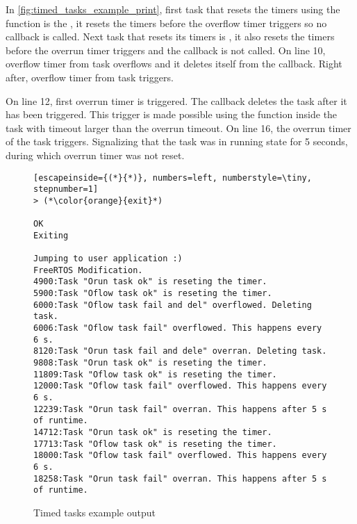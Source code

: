 In \autoref{fig:timed_tasks_example_print}, first task that resets the timers using the function  is the , it resets the timers before the overflow timer triggers so no callback is called. Next task that resets its timers is , it also resets the timers before the overrun timer triggers and the callback is not called. On line 10, overflow timer from task  overflows and it deletes itself from the callback. Right after, overflow timer from task  triggers.

On line 12, first overrun timer is triggered. The callback deletes the task after it has been triggered. This trigger is made possible using the  function inside the task with timeout larger than the overrun timeout. On line 16, the overrun timer of the task  triggers. Signalizing that the task was in running state for 5 seconds, during which overrun timer was not reset.

\begin{figure}[H]
\begin{changemargin}{1cm}{1cm}
\begin{lstlisting}[escapeinside={(*}{*)}, numbers=left, numberstyle=\tiny, stepnumber=1]
> (*\color{orange}{exit}*)

OK
Exiting

Jumping to user application :)
FreeRTOS Modification.
4900:Task "Orun task ok" is reseting the timer.
5900:Task "Oflow task ok" is reseting the timer.
6000:Task "Oflow task fail and del" overflowed. Deleting task.
6006:Task "Oflow task fail" overflowed. This happens every 6 s.
8120:Task "Orun task fail and dele" overran. Deleting task.
9808:Task "Orun task ok" is reseting the timer.
11809:Task "Oflow task ok" is reseting the timer.
12000:Task "Oflow task fail" overflowed. This happens every 6 s.
12239:Task "Orun task fail" overran. This happens after 5 s of runtime.
14712:Task "Orun task ok" is reseting the timer.
17713:Task "Oflow task ok" is reseting the timer.
18000:Task "Oflow task fail" overflowed. This happens every 6 s.
18258:Task "Orun task fail" overran. This happens after 5 s of runtime.
\end{lstlisting}  
\end{changemargin}
\caption{Timed tasks example output}
\label{fig:timed_tasks_example_print}
\end{figure}